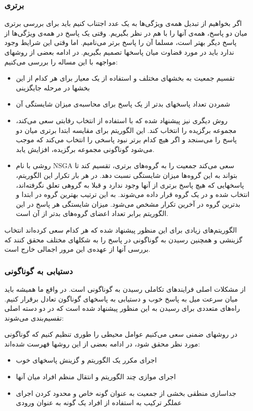 \documentclass{report}
\begin{document}
\subsubsection{برتری}
اگر بخواهیم از تبدیل همه‌ی ويژگی‌ها به یک عدد اجتناب کنیم باید برای بررسی برتری میان دو پاسخ، همه‌ی آنها را با هم در نظر بگیریم. وقتی یک پاسخ در همه‌ی ويژگی‌ها از پاسخ دیگر بهتر است، مسلما آن را پاسخ برتر می‌نامیم. اما وقتی این شرایط وجود ندارد باید در مورد قضاوت میان پاسخها تصمیم بگیریم. در ادامه بعضی از روشهای مواجهه با این مساله را بررسی می‌کنیم:
\begin{itemize}
\item
تقسیم جمعیت به بخشهای مختلف و استفاده از یک معیار برای هر کدام از این بخشها در مرحله جایگزینی
\item
شمردن تعداد پاسخهای بدتر از یک پاسخ برای محاسبه‌ی میزان شایستگی آن
\item
روش دیگری نیز پیشنهاد شده که با استفاده از انتخاب رقابتی سعی می‌کند، مجموعه برگزیده را انتخاب کند. این الگوریتم برای مقایسه ابتدا برتری میان دو پاسخ را می‌سنجد و اگر هیچ کدام برتر نبود پاسخی را انتخاب می‌کند که موجب می‌شود گوناگونی مجموعه برگزیده، افزایش یابد.
\item
روشی با نام NSGA سعی می‌کند جمعیت را به گروه‌های برتری، تقسیم کند تا بتواند به این گروه‌ها میزان شایستگی نسبت دهد. در هر بار تکرار این الگوریتم، پاسخهایی که هیچ پاسخ برتری از آنها وجود ندارد و قبلا به گروهی تعلق نگرفته‌اند، انتخاب شده و در یک گروه قرار داده می‌شوند. به این ترتیب بهترین گروه در ابتدا و بدترین گروه در آخرین تکرار مشخص می‌شود. میزان شایستگی هر پاسخ در این الگوریتم برابر تعداد اعضای گروه‌های بدتر از آن است. 
\end{itemize}
الگوریتم‌های زیادی برای این منظور پیشنهاد شده که هر کدام سعی کرده‌اند انتخاب گزینشی و همچنین رسیدن به گوناگونی در پاسخ را به شکلهای مختلف محقق کنند که بررسی آنها از عهده‌ی این مرور اجمالی خارج است.

 \subsubsection{دستیابی به گوناگونی}
از مشکلات اصلی فرایندهای تکاملی رسیدن به گوناگونی است. در واقع ما همیشه باید میان سرعت میل به پاسخ خوب و دستیابی به پاسخهای گوناگون تعادل برقرار کنیم. راه‌های متعددی برای رسیدن به این منظور پیشنهاد شده است که در دو دسته اصلی تقسیم‌بندی می‌شوند:

در روشهای ضمنی سعی می‌کنیم عوامل محیطی را طوری تنظیم کنیم که گوناگونی مورد نظر محقق شود، در ادامه بعضی از این روشها فهرست شده‌اند:
\begin{itemize}
\item
اجرای مکرر یک الگوریتم و گزینش پاسخهای خوب
\item
اجرای موازی چند الگوریتم و انتقال منظم افراد میان آنها
\item
جداسازی منطقی بخشی از جمعیت به عنوان گونه خاص و محدود کردن اجرای عملگر ترکیب به استفاده از افراد یک گونه به عنوان ورودی 
\end{itemize}
\end{document}
